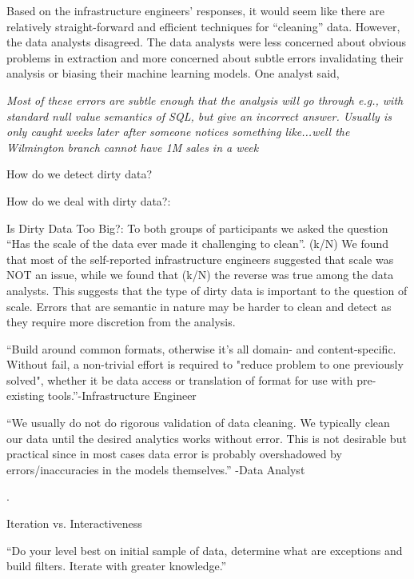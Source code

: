 \vspace{0.5em}

Based on the infrastructure engineers' responses, it would seem like there are relatively straight-forward and efficient techniques for ``cleaning'' data. However, the data analysts disagreed. The data analysts were less concerned about obvious problems in extraction and more concerned about subtle errors invalidating their analysis or biasing their machine learning models. One analyst said,

\vspace{0.5em}
\emph{Most of these errors are subtle enough that the analysis will go through e.g., with standard null value semantics of SQL, but give an incorrect answer. Usually is only caught weeks later after someone notices something like...well the Wilmington branch cannot have 1M sales in a week}

\vspace{0.5em}



  

How do we detect dirty data?

How do we deal with dirty data?: 

Is Dirty Data Too Big?: To both groups of participants we asked the question “Has the scale of the data ever made it challenging to clean”. (k/N) We found that most of the self-reported infrastructure engineers suggested that scale was NOT an issue, while we found that (k/N) the reverse was true among the data analysts. This suggests that the type of dirty data is important to the question of scale. Errors that are semantic in nature may be harder to clean and detect as they require more discretion from the analysis.

“Build around common formats, otherwise it's all domain- and content-specific. Without fail, a non-trivial effort is required to "reduce problem to one previously solved", whether it be data access or translation of format for use with pre-existing tools.”-Infrastructure Engineer

“We usually do not do rigorous validation of data cleaning. We typically clean our data until the desired analytics works without error. This is not desirable but practical since in most cases data error is probably overshadowed by errors/inaccuracies in the models themselves.” -Data Analyst

.

Iteration vs. Interactiveness

“Do your level best on initial sample of data, determine what are exceptions and build filters. Iterate with greater knowledge.”

